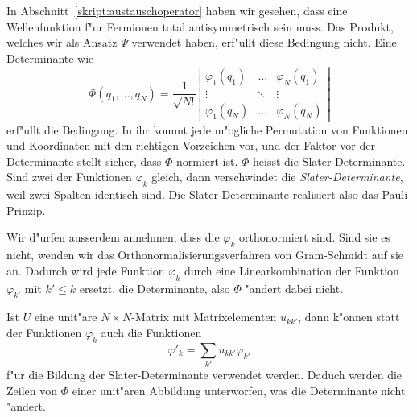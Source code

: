 In Abschnitt~\ref{skript:austauschoperator} haben wir gesehen, dass eine
Wellenfunktion f"ur Fermionen total antisymmetrisch sein muss.
Das Produkt, welches wir als Ansatz $\Psi$ verwendet haben, erf"ullt
diese Bedingung nicht.
Eine Determinante wie
\[
\Phi(q_1,\dots,q_N)=\frac{1}{\sqrt{N!}}
\left|\begin{matrix}
\varphi_1(q_1)&\dots &\varphi_N(q_1)\\
\vdots        &\ddots&\vdots        \\
\varphi_1(q_N)&\dots &\varphi_N(q_N)
\end{matrix}\right|
\]
erf"ullt die Bedingung. In ihr kommt jede m"ogliche Permutation von
Funktionen und Koordinaten mit den richtigen Vorzeichen vor, und der
Faktor vor der Determinante stellt sicher, dass $\Phi$ normiert ist.
$\Phi$ heisst die Slater-Determinante.
%
Sind zwei der Funktionen $\varphi_k$ gleich, dann verschwindet die 
{\em Slater-Determinante}, weil zwei Spalten identisch sind.
Die Slater-Determinante realisiert also das Pauli-Prinzip.

Wir d"urfen ausserdem annehmen, dass die $\varphi_k$ orthonormiert sind. 
Sind sie es nicht, wenden wir das Orthonormalisierungsverfahren von 
Gram-Schmidt auf sie an. Dadurch wird jede Funktion $\varphi_k$
durch eine Linearkombination der Funktion $\varphi_{k'}$ mit $k'\le k$
ersetzt, die Determinante, also $\Phi$ "andert dabei nicht.

Ist $U$ eine unit"are $N\times N$-Matrix mit Matrixelementen
$u_{kk'}$, dann k"onnen statt der Funktionen $\varphi_k$
auch die Funktionen 
\begin{equation}
\varphi'_k = \sum_{k'}u_{kk'}\varphi_{k'}
\label{skript:hfunitaer}
\end{equation}
f"ur die Bildung der Slater-Determinante verwendet werden.
Daduch werden die Zeilen von $\Phi$ einer unit"aren Abbildung
unterworfen, was die Determinante nicht "andert.

